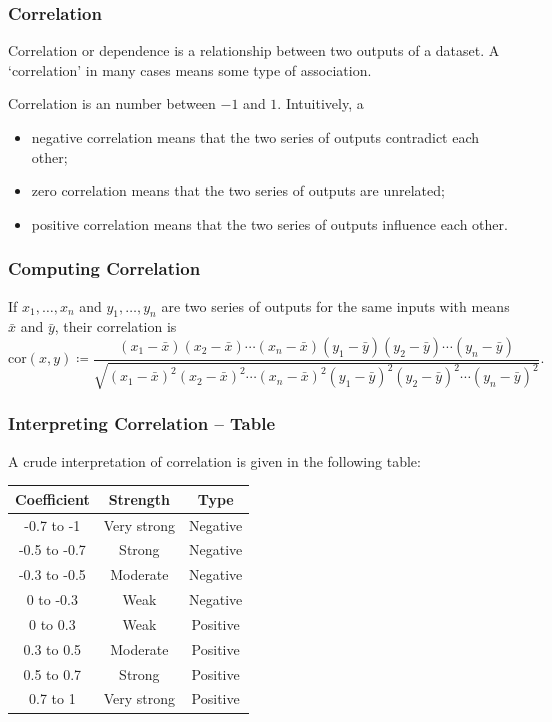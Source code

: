 \documentclass[aspectratio=169,11pt,svgnames]{beamer}
\begin{document}
\begin{frame}
 \frametitle{Correlation}
 \begin{tcolorbox}[title=Correlation]
  \alert{Correlation} or \alert{dependence} is a relationship between two
  outputs of a dataset. A `correlation' in many cases means some type of
  association.
 \end{tcolorbox}
 \pause
 Correlation is an number between $-1$ and $1$.
 \pause
 Intuitively, a
 \begin{itemize}[label=\textbullet]
  \item negative correlation means that the two series of outputs
   \alert{contradict} each other;
  \pause
  \item zero correlation means that the two series of outputs are
   \alert{unrelated};
  \pause
  \item positive correlation means that the two series of outputs
   \alert{influence} each other.
 \end{itemize}
\end{frame}

\begin{frame}
 \frametitle{Computing Correlation}
 \begin{tcolorbox}[title=Correlation Formula]
  If $x_1,\ldots,x_n$ and $y_1,\ldots,y_n$ are two series of outputs for the
  same inputs with means $\bar{x}$ and $\bar{y}$, their correlation is
  \[
   \mathrm{cor}(x,y) \coloneqq \frac{(x_1-\bar{x})(x_2-\bar{x})\cdots
   (x_n-\bar{x})(y_1-\bar{y})(y_2-\bar{y})\cdots
  (y_n-\bar{y})}{\sqrt{(x_1-\bar{x})^2(x_2-\bar{x})^2\cdots
 (x_n-\bar{x})^2(y_1-\bar{y})^2(y_2-\bar{y})^2\cdots (y_n-\bar{y})^2}}.
  \]
 \end{tcolorbox}
\end{frame}

\begin{frame}
 \frametitle{Interpreting Correlation -- Table}
 A crude interpretation of correlation is given in the following table:
 \begin{center}
  \begin{tabular}{ccc}
   \textbf{Coefficient} & \textbf{Strength} & \textbf{Type} \\
   \toprule
   -0.7 to -1 & Very strong & Negative\\
   -0.5 to -0.7 & Strong & Negative\\
   -0.3 to -0.5 & Moderate & Negative\\
   0 to -0.3 & Weak & Negative\\
   0 to 0.3 & Weak & Positive\\
   0.3 to 0.5 & Moderate & Positive\\
   0.5 to 0.7 & Strong & Positive\\
   0.7 to 1 & Very strong & Positive
  \end{tabular}
 \end{center}
\end{frame}
\end{document}
